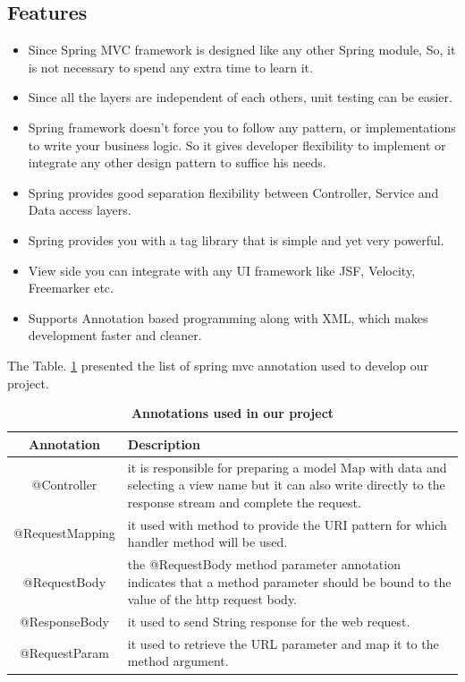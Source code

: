 \subsection{Features}
\begin{itemize}
	\item Since Spring MVC framework is designed like any other Spring module, So, it is not necessary to spend any extra time to learn it.
	\item Since all the layers are independent of each others, unit testing can be easier.
	\item Spring framework doesn’t force you to follow any pattern, or implementations to write your business logic. So it gives developer flexibility to implement or integrate any other design pattern to suffice his needs.
	\item Spring provides good separation flexibility between Controller, Service and Data access layers.
	\item Spring provides you with a tag library that is simple and yet very powerful.
	\item View side you can integrate with any UI framework like JSF, Velocity, Freemarker etc.
	\item Supports Annotation based programming along with XML, which makes development faster and cleaner.
\end{itemize}
The Table. \ref{TabAU} presented the list of spring mvc annotation used to develop our project.
\begin{table}[h]
	\caption{ \textbf{Annotations used in our project}}
	\label{TabAU}
	\centering
	\begin{tabular}{|c|p{10cm}|}
		\hline
		\textbf{Annotation} & \textbf{Description }\\
		\hline
		@Controller & it is responsible for preparing a model Map with data and selecting a view name but it can also write directly to the response stream and complete the request.  \\
		\hline
		@RequestMapping & it used with method to provide the URI pattern for which handler method will be used.\\
		\hline
		@RequestBody & the @RequestBody method parameter annotation indicates that a method parameter should be bound to the value of the http request body.  \\
		\hline
		@ResponseBody & it used to send String response for the web request.  \\
		\hline	
		@RequestParam & it used to retrieve the URL parameter and map it to the method argument. \\
		\hline
	\end{tabular}
\end{table}


